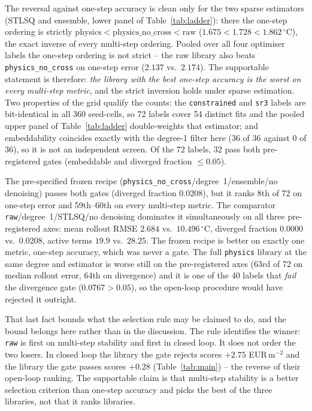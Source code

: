 The reversal against one-step accuracy is clean only for the two sparse estimators
(STLSQ and ensemble, lower panel of Table~\ref{tab:ladder}): there the one-step ordering
is strictly $\text{physics} < \text{physics\_no\_cross} < \text{raw}$
($1.675 < 1.728 < 1.862\,^\circ$C), the exact inverse of every multi-step ordering.
Pooled over all four optimiser labels the one-step ordering is not strict -- the raw
library also beats \texttt{physics\_no\_cross} on one-step error ($2.137$ vs.\ $2.174$).
The supportable statement is therefore: \emph{the library with the best one-step accuracy
is the worst on every multi-step metric}, and the strict inversion holds under sparse
estimation. Two properties of the grid qualify the counts: the \texttt{constrained} and
\texttt{sr3} labels are bit-identical in all 360 seed-cells, so 72 labels cover 54 distinct
fits and the pooled upper panel of Table~\ref{tab:ladder} double-weights that estimator;
and embeddability coincides exactly with the degree-1 filter here (36 of 36 against
0 of 36), so it is not an independent screen. Of the 72 labels, 32 pass both
pre-registered gates (embeddable and diverged fraction $\le 0.05$).

The pre-specified frozen recipe
(\texttt{physics\_no\_cross}/degree~1/ensemble/no denoising) passes both gates
(diverged fraction $0.0208$), but it ranks 8th of 72 on one-step error and 59th--60th on
every multi-step metric. The comparator \texttt{raw}/degree~1/STLSQ/no denoising
dominates it simultaneously on all three pre-registered axes: mean rollout RMSE $2.684$
vs.\ $10.496\,^\circ$C, diverged fraction $0.0000$ vs.\ $0.0208$, active terms $19.9$ vs.\
$28.25$. The frozen recipe is better on exactly one metric, one-step accuracy, which was
never a gate. The full \texttt{physics} library at the same degree and estimator is worse
still on the pre-registered axes (63rd of 72 on median rollout error, 64th on divergence) and it is one of the 40 labels that \emph{fail} the divergence gate
($0.0767 > 0.05$), so the open-loop procedure would have rejected it outright.

That last fact bounds what the selection rule may be claimed to do, and the bound belongs
here rather than in the discussion. The rule identifies the winner: \texttt{raw} is first
on multi-step stability and first in closed loop. It does not order the two losers. In
closed loop the library the gate rejects scores $+2.75$ EUR\,m$^{-2}$ and the library the
gate passes scores $+0.28$ (Table~\ref{tab:main}) -- the reverse of their open-loop
ranking. The supportable claim is that multi-step stability is a better selection criterion
than one-step accuracy and picks the best of the three libraries, not that it ranks
libraries.

